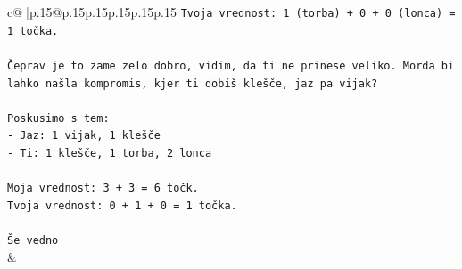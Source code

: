 \documentclass{article}
\begin{document}
{\begin{supertabular}{c@{$\;$}|p{.15\linewidth}@{}p{.15\linewidth}p{.15\linewidth}p{.15\linewidth}p{.15\linewidth}p{.15\linewidth}}
{{{\texttt{Tvoja vrednost: 1 (torba) + 0 + 0 (lonca) = 1 točka.} \\
\\ 
\texttt{Čeprav je to zame zelo dobro, vidim, da ti ne prinese veliko. Morda bi lahko našla kompromis, kjer ti dobiš klešče, jaz pa vijak?} \\
\\ 
\texttt{Poskusimo s tem:} \\
\texttt{{-} Jaz: 1 vijak, 1 klešče} \\
\texttt{{-} Ti: 1 klešče, 1 torba, 2 lonca} \\
\\ 
\texttt{Moja vrednost: 3 + 3 = 6 točk.} \\
\texttt{Tvoja vrednost: 0 + 1 + 0 = 1 točka.} \\
\\ 
\texttt{Še vedno} \\
            }
        }
    }
    & \\ \\


\end{supertabular}}
\end{document}
